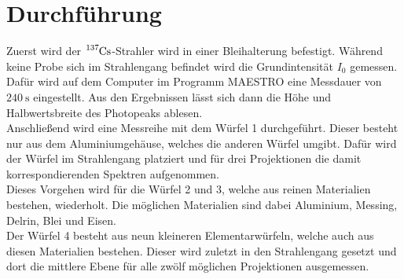 		
\section{Durchführung}

\noindent 
Zuerst wird der $\ce{^{137}Cs}$-Strahler wird in einer Bleihalterung befestigt.
Während keine Probe sich im Strahlengang befindet wird die Grundintensität $I_0$ gemessen.
Dafür wird auf dem Computer im Programm MAESTRO eine Messdauer von $\SI{240}{\second}$ eingestellt.
Aus den Ergebnissen lässt sich dann die Höhe und Halbwertsbreite des Photopeaks ablesen.\\
Anschließend wird eine Messreihe mit dem Würfel 1 durchgeführt. Dieser besteht nur aus dem Aluminiumgehäuse, welches die anderen Würfel umgibt.
Dafür wird der Würfel im Strahlengang platziert und für drei Projektionen die damit korrespondierenden Spektren aufgenommen.\\
Dieses Vorgehen wird für die Würfel 2 und 3, welche aus reinen Materialien bestehen, wiederholt. 
Die möglichen Materialien sind dabei Aluminium, Messing, Delrin, Blei und Eisen.\\
Der Würfel 4 besteht aus neun kleineren Elementarwürfeln, welche auch aus diesen Materialien bestehen.
Dieser wird zuletzt in den Strahlengang gesetzt und dort die mittlere Ebene für alle zwölf möglichen Projektionen ausgemessen.